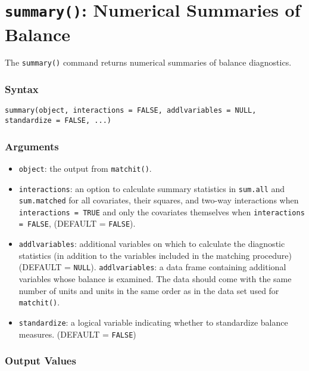 \section{\texttt{summary()}: Numerical Summaries of Balance}

The \texttt{summary()} command returns numerical summaries of balance
diagnostics.

\subsubsection{Syntax}
\begin{verbatim}
summary(object, interactions = FALSE, addlvariables = NULL, standardize = FALSE, ...)
\end{verbatim}

\subsubsection{Arguments}

\begin{itemize}
\item \texttt{object}: the output from {\tt matchit()}.
\item \texttt{interactions}: an option to calculate summary statistics
  in \texttt{sum.all} and \texttt{sum.matched} for all covariates,
  their squares, and two-way interactions when \texttt{interactions =
    TRUE} and only the covariates themselves when \texttt{interactions
    = FALSE}, (DEFAULT = {\tt FALSE}).
\item \texttt{addlvariables}: additional variables on which to
  calculate the diagnostic statistics (in addition to the variables
  included in the matching procedure) (DEFAULT = {\tt NULL}).
  \texttt{addlvariables}: a data frame containing additional variables
  whose balance is examined. The data should come with the same number
  of units and units in the same order as in the data set used for
  {\tt matchit()}.
\item \texttt{standardize}: a logical variable indicating whether to
  standardize balance measures. (DEFAULT = {\tt FALSE})
\end{itemize}

\subsubsection{Output Values}

